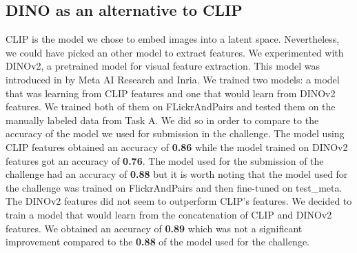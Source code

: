 \documentclass[12pt,a4paper]{article}
\begin{document}
\subsection{DINO as an alternative to CLIP}
CLIP is the model we chose to embed images into a latent space. Nevertheless, we could have picked an other model to extract features. We experimented with DINOv2, a pretrained model for visual feature extraction. This model was introduced in \autocite*{oquabDINOv2LearningRobust2024} by Meta AI Research and Inria. We trained two models: a model that was learning from CLIP features and one that would learn from DINOv2 features. We trained both of them on FLickrAndPairs and tested them on the manually labeled data from Task A. We did so in order to compare to the accuracy of the model we used for submission in the challenge. The model using CLIP features obtained an accuracy of \textbf{0.86} while the model trained on DINOv2 features got an accuracy of \textbf{0.76}. The model used for the submission of the challenge had an accuracy of \textbf{0.88} but it is worth noting that the model used for the challenge was trained on FlickrAndPairs and then fine-tuned on test\_meta. The DINOv2 features did not seem to outperform CLIP's features. We decided to train a model that would learn from the concatenation of CLIP and DINOv2 features. We obtained an accuracy of  \textbf{0.89} which was not a significant improvement compared to the \textbf{0.88} of the model used for the challenge.
\end{document}
